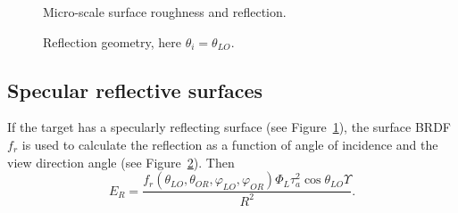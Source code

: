 
\begin{figure}[t]
\centering
{}
\caption{Micro-scale surface roughness and reflection.\label{nonlambert}}
\end{figure}

\begin{figure}[bt]
\centerline{}
\caption{Reflection geometry, here $\theta_i=\theta_{LO}$.\label{fig:specref}}
\end{figure}

\subsection{Specular reflective surfaces}
\label{rfdetectpaint}
\noindent
{}If the target has a specularly reflecting surface (see Figure~\ref{nonlambert}), the surface BRDF $f_r$ is used to calculate the reflection as a function of angle of incidence and the view direction angle (see Figure~\ref{fig:specref}). Then 
\begin{equation}
E_R = \frac{f_r(\theta_{LO}, \theta_{OR},\varphi_{LO},\varphi_{OR}
) \Phi_L \tau^2_{a} \cos\theta_{LO}\Upsilon}{ R^2 }. %
\label{lrfi3}
\end{equation}

